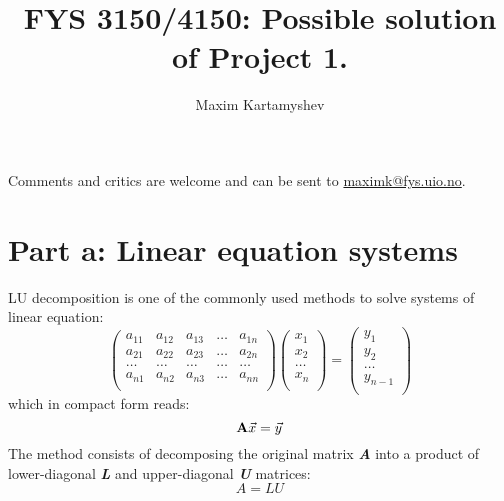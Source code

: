 \documentclass[]{article}
\begin{document}
  
  \title{FYS 3150/4150: Possible solution of Project 1.}
  \author{Maxim Kartamyshev}
  \date{}

  
  \maketitle
  
  Comments and critics are welcome and can be sent to 
  \href{mailto::maximk@fys.uio.no}{maximk@fys.uio.no}.
  
  
  \section{Part a: Linear equation systems}
  LU decomposition is one of the commonly used methods to solve systems of linear equation:
  \begin{equation}
    \left(\begin{array}{ccccc}
      a_{11}& a_{12}& a_{13} &\dots &a_{1n}  \\
      a_{21}& a_{22}& a_{23} &\dots &a_{2n}  \\
      \dots &\dots  &\dots   &\dots &\dots   \\
      a_{n1}& a_{n2}& a_{n3} &\dots &a_{nn}  \\
    \end{array}
    \right)\left(\begin{array}{c}
      x_1     \\
      x_2     \\
      \dots   \\
      x_n     \\
    \end{array} \right)
    =
    \left(\begin{array}{c}
      y_1     \\
      y_2     \\
      \dots   \\
      y_{n-1} \\
    \end{array} \right)\nonumber
  \end{equation}
  which in compact form reads:
  \begin{equation}
    {\bf A}{\vec x} = {\vec y}  \label{eq:lu_system}
  \end{equation}
  The method consists of decomposing the original matrix {\bf \it A} into a product of lower-diagonal {\bf \it L}
  and upper-diagonal {\bf \it U} matrices:
  \begin{equation}
  A = LU \nonumber
  \end{equation}
\end{document}
